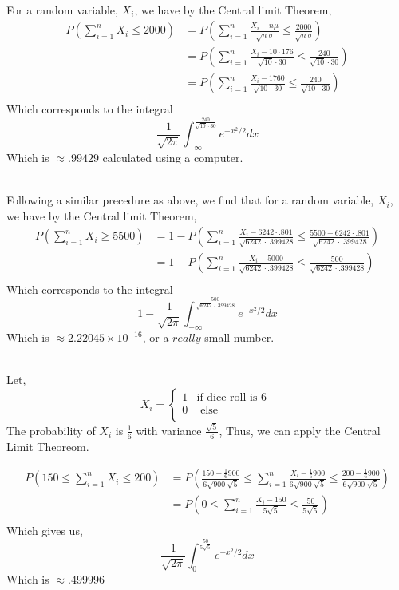 \documentclass[letterpaper,12pt]{article}
\theoremstyle{definition}
\begin{document}
\\
For a random variable, $X_i$, we have by the Central limit Theorem,
\begin{align*}
    P( \sum^{n}_{i=1} X_i \leq 2000) &= P( \sum^{n}_{i=1}\frac{ X_i - n\mu }{\sqrt{n} \sigma}\leq \frac{ 2000 }{\sqrt{n} \sigma}) \\
    &= P( \sum^{n}_{i=1}\frac{ X_i - 10\cdot176 }{\sqrt{10} \cdot 30}\leq \frac{240}{\sqrt{10} \cdot 30}) \\
    &= P( \sum^{n}_{i=1}\frac{ X_i - 1760 }{\sqrt{10} \cdot 30}\leq \frac{240}{\sqrt{10} \cdot 30}) \\
\end{align*}
Which corresponds to the integral
\[\frac{1}{\sqrt{2 \pi}} \int_{-\infty}^{\frac{240}{\sqrt{10}\cdot 30}} e^{-x^2/2} dx\] 
Which is $\approx .99429$ calculated using a computer.


\\
Following a similar precedure as above, we find that for a random variable, $X_i$, we have by the Central limit Theorem,
\begin{align*}
    P( \sum^{n}_{i=1} X_i \geq 5500) &= 1 - P( \sum^{n}_{i=1}\frac{ X_i - 6242\cdot.801 }{\sqrt{6242} \cdot.399428}\leq \frac{5500- 6242\cdot.801 }{\sqrt{6242}\cdot .399428}) \\
    &=1 -  P( \sum^{n}_{i=1}\frac{ X_i - 5000 }{\sqrt{6242}\cdot .399428}\leq \frac{500}{\sqrt{6242} \cdot.399428}) \\
\end{align*}
Which corresponds to the integral
\[1 - \frac{1}{\sqrt{2 \pi}} \int_{-\infty}^{\frac{500}{\sqrt{6242}\cdot .399428}} e^{-x^2/2} dx\]
Which is $\approx 2.22045\times10^{-16}$, or a $really$ small number.

\\
Let,
\[X_i = 
\begin{cases}
    1 & \text{if dice roll is  6 }\\
    0 & \text{ else}\\
\end{cases}
\]
The probability of $X_i$ is $\frac{1}{6}$ with variance $\frac{\sqrt{5}}{6}$, Thus, we can apply the Central Limit Theoreom.

\begin{align*}
    P\left( 150 \leq \sum^{n}_{i=1} X_i \leq 200 \right) &= P\left( \frac{150 - \frac{1}{6}900}{6\sqrt{900}\sqrt{5}} \leq \sum^{n}_{i=1} \frac{X_i - \frac{1}{6}900}{6\sqrt{900}\sqrt{5}} \leq \frac{200-\frac{1}{6}900}{6\sqrt{900}\sqrt{5}} \right) \\
    &= P\left( 0 \leq \sum^{n}_{i=1} \frac{X_i - 150}{5\sqrt{5}} \leq \frac{50}{5\sqrt{5}} \right) \\
\end{align*}
Which gives us, 
\[ \frac{1}{\sqrt{2 \pi}} \int_{0}^{\frac{50}{5\sqrt{5}}} e^{-x^2/2}dx\]
Which is $\approx .499996$
\end{document}
